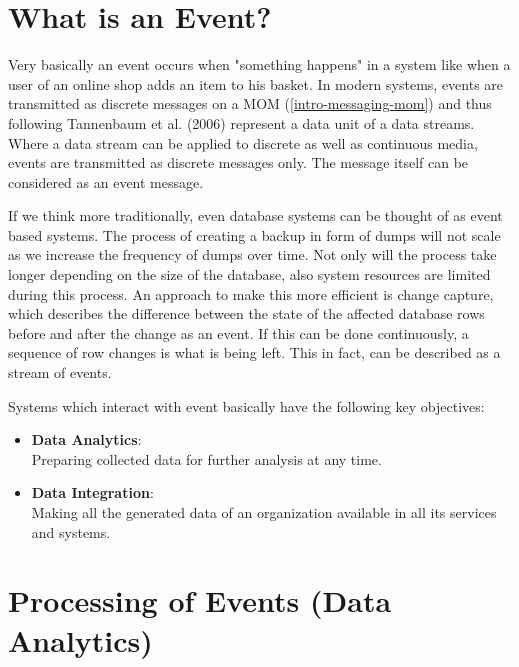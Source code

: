 \section{What is an Event?}
\label{intro-datastream-datastream}
Very basically an event occurs when "something happens"  in a system like when a
user of an online shop adds an item to his basket. In modern systems, events are
transmitted as discrete messages on a MOM (\ref{intro-messaging-mom}) and
thus following Tannenbaum et al. (2006) represent a data unit of a data
streams. Where a data stream can be applied to discrete as well as continuous
media, events are transmitted as discrete messages only. The message itself
can be considered as an event message. \cite{EIP03}

If we think more traditionally, even database systems can be thought of as
event based systems. The process of creating a backup in form of dumps will not
scale as we increase the frequency of dumps over time. Not only will the process
take longer depending on the size of the database, also system resources are
limited during this process. An approach to make this more efficient
is change capture, which describes the difference between the state of the
affected database rows before and after the change as an event. If this can be done
continuously, a sequence of row changes is what is being left. This in fact,
can be described as a stream of events.

Systems which interact with event basically have the following key objectives: 
\begin{itemize}
    \item {\bf Data Analytics}: \hfill \\ Preparing collected data for further analysis at any time.
    \item {\bf Data Integration}: \hfill \\ Making all the generated data of an
        organization available in all its services and systems.
\end{itemize}

\section{Processing of Events (Data Analytics)}

